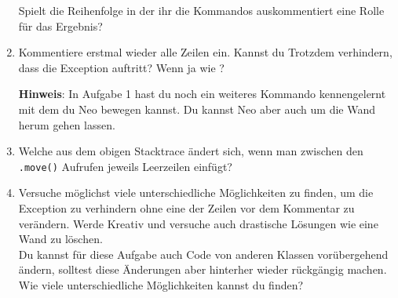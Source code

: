 \begin{enumerate}[label=\alph*)]
        Spielt die Reihenfolge in der ihr die Kommandos auskommentiert eine Rolle für das Ergebnis?
    \item Kommentiere erstmal wieder alle Zeilen ein.
        Kannst du Trotzdem verhindern, dass die Exception auftritt?
        Wenn ja wie ?

    \textbf{Hinweis}: In Aufgabe 1 hast du noch ein weiteres Kommando kennengelernt mit dem du Neo bewegen kannst.
        Du kannst Neo aber auch um die Wand herum gehen lassen.
    \item \optional Welche  aus dem obigen Stacktrace ändert sich, wenn man zwischen den \lstinline{.move()} Aufrufen jeweils Leerzeilen einfügt?
    \item \optional Versuche möglichst viele unterschiedliche Möglichkeiten zu finden, um die Exception zu verhindern ohne eine der Zeilen vor dem Kommentar zu verändern.
        Werde Kreativ und versuche auch drastische Lösungen wie eine Wand zu löschen.\\
        Du kannst für diese Aufgabe auch Code von anderen Klassen vorübergehend ändern, solltest diese Änderungen aber hinterher wieder rückgängig machen.
        Wie viele unterschiedliche Möglichkeiten kannst du finden?
\end{enumerate}
 
